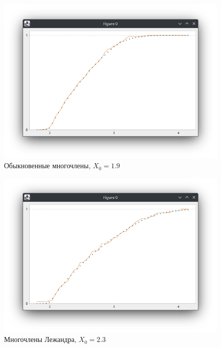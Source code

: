 \documentclass[a4paper,14pt]{extarticle}
\begin{document}
    \begin{figure}[h]
        \centering
        \includegraphics[scale=0.5]{images/poly19}
        \caption{Обыкновенные многочлены, $X_0 = 1.9$}
    \end{figure}
    \begin{figure}[h]
        \centering
        \includegraphics[scale=0.5]{images/lege23}
        \caption{Многочлены Лежандра, $X_0 = 2.3$}
    \end{figure}

    \newpage
\end{document}
